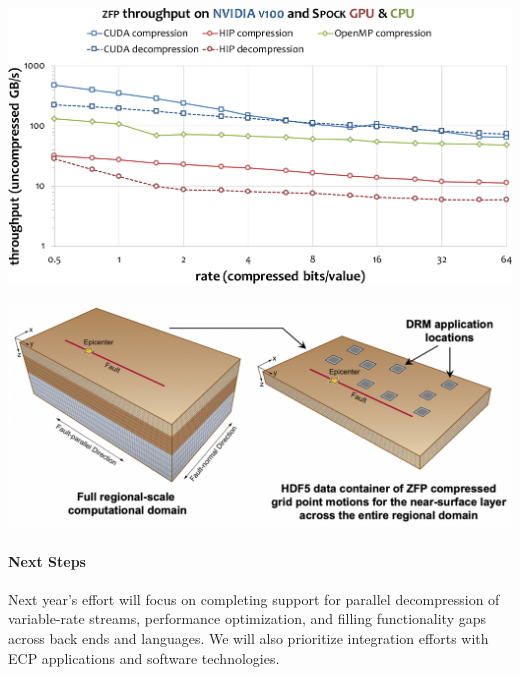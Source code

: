 \noindent
\begin{minipage}[t]{\textwidth}
\begin{minipage}[t]{0.46\textwidth}
\vspace{0pt}%
\includegraphics[width=\textwidth]{projects/2.3.4-DataViz/2.3.4.16-ALPINE-ZFP/zfp-performance}%
\vspace{-1ex}%
\captionsetup{width=\linewidth}%
\label{fig:zfp-performance}%
\end{minipage}
%
\hfill%
%
\begin{minipage}[t]{0.51\textwidth}
\vspace{0pt}%
\includegraphics[width=\textwidth]{projects/2.3.4-DataViz/2.3.4.16-ALPINE-ZFP/zfp-sw4-hdf5}%
\vspace{-1ex}%
\captionsetup{width=\linewidth}%
%
\label{fig:zfp-sw4-hdf5}%
\end{minipage}
\end{minipage}

\paragraph{Next Steps}

Next year's effort will focus on completing support for parallel decompression of variable-rate streams, performance optimization, and filling functionality gaps across back ends and languages.
We will also prioritize integration efforts with ECP applications and software technologies.
